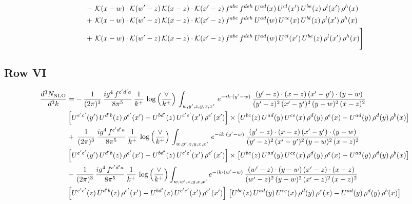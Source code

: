 \documentclass[9pt]{article}
\numberwithin{equation}{section}
\begin{document}
\begin{align}
&-\,\mathcal{K}(x-w)\cdot\mathcal{K}(w'-z)\,\mathcal{K}(x-z)\cdot\mathcal{K}(x'-z)\,f^{abc}\,f^{deh}\,U^{ad}(x)\,U^{cl}(x')\,U^{be}(z)\,\rho^{l}(x')\,\rho^{h}(x)\notag \\ 
&+\,\mathcal{K}(x-w)\cdot\mathcal{K}(w'-z)\,\mathcal{K}(x-z)\cdot\mathcal{K}(x'-z)\,f^{abc}\,f^{deh}\,U^{ad}(w)\,U^{ce}(x)\,U^{bl}(z)\,\rho^{l}(x')\,\rho^{h}(x)\notag \\ 
&+\,\mathcal{K}(x-w)\cdot\mathcal{K}(w'-z)\,\mathcal{K}(x-z)\cdot\mathcal{K}(x'-z)\,f^{abc}\,f^{deh}\,U^{ad}(w)\,U^{cl}(x')\,U^{be}(z)\,\rho^{l}(x')\,\rho^{h}(x)\Bigg]
\end{align}
\subsection{Row VI}
\begin{align}
    \frac{d^{3}N_{\rm NLO}}{d^{3}k} & =    -\,\frac{1}{(2\pi)^{3}}\, \frac{ig^{4}\,f^{c'd'a}}{8\pi^{5}}\, \frac{1}{k^{+}}\,\log{\left(\frac{\vee}{k^{+}}\right)}\, \int_{w,y',z,y,x,x'}\, e^{-ik\cdot (y'-w)}\,\frac{(y'-z)\cdot (x-z)\,(x'-y')\cdot (y-w)}{(y'-z)^{2}\,(x'-y')^{2}\,(y-w)^{2}\,(x-z)^{2}}\notag \\ & \left[U^{e'c'}(y')\,U^{d'b}(z)\,\rho^{e'}(x')-U^{bd'}(z)\,U^{c'e'}(x')\,\rho^{e'}(x')\right]\times  \left[U^{bc}(z)\,U^{ad}(y)\,U^{ce}(x)\,\rho^{d}(y)\,\rho^{e}(x)-U^{ad}(y)\,\rho^{d}(y)\,\rho^{b}(x)\right] \notag \\
&   +\,\frac{1}{(2\pi)^{3}}\, \frac{ig^{4}\,f^{c'd'a}}{8\pi^{5}}\, \frac{1}{k^{+}}\,\log{\left(\frac{\vee}{k^{+}}\right)}\, \int_{w,y',z,y,x,x'}\, e^{-ik\cdot (y'-w)}\,\frac{(y'-z)\cdot (x-z)\,(x'-y')\cdot (y-w)}{(y'-z)^{2}\,(x'-y')^{2}\,(y-w)^{2}\,(x-z)^{2}}\notag \\ &   \left[U^{e'c'}(y')\,U^{d'b}(z)\,\rho^{e'}(x')-U^{bd'}(z)\,U^{c'e'}(x')\,\rho^{e'}(x')\right]\times  \left[U^{bc}(z)\,U^{ad}(y)\,U^{ce}(x)\,\rho^{d}(y)\,\rho^{e}(x)-U^{ad}(y)\,\rho^{d}(y)\,\rho^{b}(x)\right] \notag \\
&   -\frac{1}{(2\pi)^{3}}\, \frac{ig^{4}\,f^{c'd'a}}{8\pi^{5}}\, \frac{1}{k^{+}}\,\log{\left(\frac{\vee}{k^{+}}\right)}\int_{w,w',z,y,x,x'} e^{-ik\cdot (w'-w)}\,\frac{(w'-z)\cdot (y-w)\,(x'-z)\cdot (x-z)}{(w'-z)^{2}\,(y-w)^{2}\,(x'-z)^{2}\,(x-z)^{2}}\notag \\
&   \left[U^{e'c'}(z)\,U^{d'b}(z)\,\rho^{e'}(x')-U^{bd'}(z)\,U^{c'e'}(x')\,\rho^{e'}(x')\right]\,\left[U^{bc}(z)\,U^{ad}(y)\,U^{ce}(x)\,\rho^{d}(y)\,\rho^{e}(x)-U^{ad}(y)\,\rho^{d}(y)\,\rho^{b}(x)\right]
\end{align}
\end{document}
